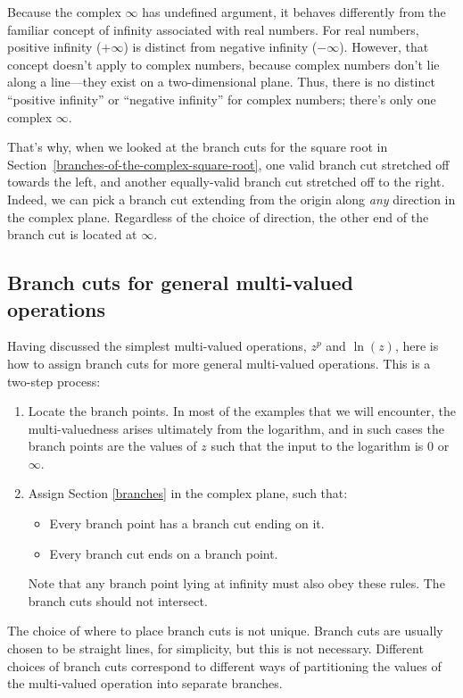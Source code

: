 \documentclass[10pt,a4paper]{article}
\begin{document}
Because the complex $\infty$ has undefined argument, it behaves
differently from the familiar concept of infinity associated with real
numbers. For real numbers, positive infinity ($+\infty$) is distinct
from negative infinity ($-\infty$). However, that concept doesn't
apply to complex numbers, because complex numbers don't lie along a
line---they exist on a two-dimensional plane. Thus, there is no distinct
``positive infinity'' or ``negative infinity'' for complex numbers;
there's only one complex $\infty$.

That's why, when we looked at the branch cuts for the square root in
Section~\ref{branches-of-the-complex-square-root}, one valid branch
cut stretched off towards the left, and another equally-valid branch
cut stretched off to the right. Indeed, we can pick a branch cut
extending from the origin along \emph{any} direction in the complex
plane. Regardless of the choice of direction, the other end of the
branch cut is located at $\infty$.

\subsection{Branch cuts for general multi-valued operations}
\label{branch-cuts-for-general-multi-valued-operations}

Having discussed the simplest multi-valued operations, $z^p$ and
$\ln(z)$, here is how to assign branch cuts for more general
multi-valued operations. This is a two-step process:

\begin{enumerate}
\item
Locate the branch points. In most of the examples that we will
encounter, the multi-valuedness arises ultimately from the logarithm,
and in such cases the branch points are the values of $z$ such that
the input to the logarithm is $0$ or $\infty$.

\item Assign Section \ref{branches} in the complex plane, such that:
  \begin{itemize}
  \item Every branch point has a branch cut ending on it.
  \item Every branch cut ends on a branch point.
  \end{itemize}
  Note that any branch point lying at infinity must also obey these
  rules.  The branch cuts should not intersect.
\end{enumerate}

The choice of where to place branch cuts is not unique. Branch cuts are
usually chosen to be straight lines, for simplicity, but this is not
necessary. Different choices of branch cuts correspond to different ways
of partitioning the values of the multi-valued operation into separate
branches.
\end{document}
